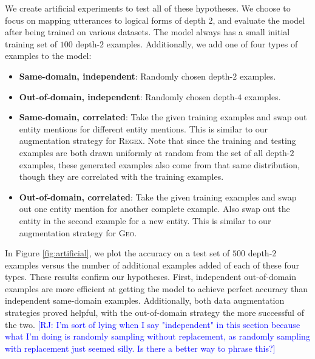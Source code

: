 \documentclass[11pt,letterpaper]{article}
\newcommand{\regex}{\textsc{Regex}\xspace}
\newcommand{\geo}{\textsc{Geo}\xspace}
\newcommand\rj[1]{\textcolor{blue}{[RJ: #1]}}
\begin{document}
We create artificial experiments to test all of these hypotheses.
We choose to focus on mapping utterances to logical forms of depth $2$,
and evaluate the model after being trained on various datasets.
The model always has a small initial training set of $100$ depth-$2$ examples.
Additionally, we add one of four types of examples to the model:
\begin{itemize}
  \item \textbf{Same-domain, independent}: Randomly chosen depth-$2$ examples.
  \item \textbf{Out-of-domain, independent}: Randomly chosen depth-$4$ examples.
  \item \textbf{Same-domain, correlated}: Take the given training examples
    and swap out entity mentions for different entity mentions.
    This is similar to our augmentation strategy for \regex.
    Note that since the training and testing examples
    are both drawn uniformly at random from the set of all depth-$2$ 
    examples, these generated examples also come from that same distribution,
    though they are correlated with the training examples.
  \item \textbf{Out-of-domain, correlated}: Take the given training examples
    and swap out one entity mention for another complete example.
    Also swap out the entity in the second example for a new entity.
    This is similar to our augmentation strategy for \geo.
\end{itemize}
In Figure \ref{fig:artificial}, we plot the accuracy on a test set 
of $500$ depth-$2$ examples versus the number of additional examples added
of each of these four types.
These results confirm our hypotheses.  
First, independent out-of-domain examples are more efficient
at getting the model to achieve perfect accuracy than independent same-domain examples.
Additionally, both data augmentation strategies proved helpful,
with the out-of-domain strategy the more successful of the two.
\rj{I'm sort of lying when I say "independent" in this section because
  what I'm doing is randomly sampling without replacement,
  as randomly sampling with replacement just seemed silly.
Is there a better way to phrase this?}
\end{document}
